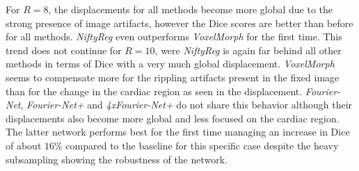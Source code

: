 \documentclass[english,version-2022-01]{uzl-thesis} %
\begin{document}
For $R=8$, the displacements for all methods become more global due to the strong presence of image artifacts, however the Dice scores are better than before for all methods. \emph{NiftyReg} even outperforms \emph{VoxelMorph} for the first time. This trend does not continue for $R=10$, were \emph{NiftyReg} is again far behind all other methods in terms of Dice with a very much global displacement. \emph{VoxelMorph} seems to compensate more for the rippling artifacts present in the fixed image than for the change in the cardiac region as seen in the displacement. \emph{Fourier-Net}, \emph{Fourier-Net+} and \emph{4xFourier-Net+} do not share this behavior although their displacements also become more global and less focused on the cardiac region. The latter network performs best for the first time managing an increase in Dice of about $16\%$ compared to the baseline for this specific case despite the heavy subsampling showing the robustness of the network.
\end{document}
